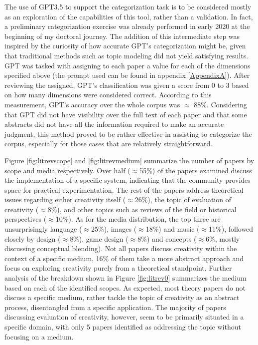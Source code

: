 The use of GPT3.5 to support the categorization task is to be considered mostly as an exploration of the capabilities of this tool, rather than a validation. In fact, a preliminary categorization exercise was already performed in early 2020 at the beginning of my doctoral journey. The addition of this intermediate step was inspired by the curiosity of how accurate GPT's categorization might be, given that traditional methods such as topic modeling did not yield satisfying results. GPT was tasked with assigning to each paper a value for each of the dimensions specified above (the prompt used can be found in appendix \ref{AppendixA}). After reviewing the assigned, GPT's classification was given a score from 0 to 3 based on how many dimensions were considered correct. According to this measurement, GPT's accuracy over the whole corpus was $\approx$ 88\%. Considering that GPT did not have visibility over the full text of each paper and that some abstracts did not have all the information required to make an accurate judgment, this method proved to be rather effective in assisting to categorize the corpus, especially for those cases that are relatively straightforward.

Figure \ref{fig:litrevscope} and \ref{fig:litrevmedium} summarize the number of papers by scope and media respectively. Over half  ($\approx$55\%) of the papers examined discuss the implementation of a specific system, indicating that the community provides space for practical experimentation. The rest of the papers address theoretical issues regarding either creativity itself ($\approx$26\%), the topic of evaluation of creativity ($\approx$8\%), and other topics such as reviews of the field or historical perspectives ($\approx$10\%). As for the media distribution, the top three are unsurprisingly language ($\approx$25\%), images ($\approx$18\%) and music ($\approx$11\%), followed closely by design ($\approx$8\%), game design ($\approx$8\%) and concepts ($\approx$6\%, mostly discussing conceptual blending). Not all papers discuss creativity within the context of a specific medium, 16\% of them take a more abstract approach and focus on exploring creativity purely from a theoretical standpoint.
Further analysis of the breakdown shown in Figure \ref{fig:litrev0} summarizes the medium based on each of the identified scopes. As expected, most theory papers do not discuss a specific medium, rather tackle the topic of creativity as an abstract process, disentangled from a specific application. The majority of papers discussing evaluation of creativity, however, seem to be primarily situated in a specific domain, with only 5 papers identified as addressing the topic without focusing on a medium. 

